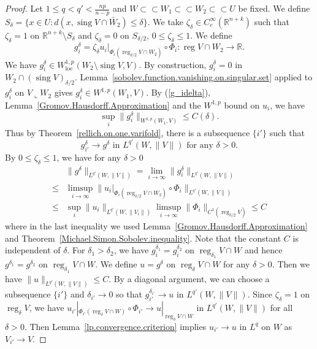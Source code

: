 \documentclass[11pt]{amsart}
\theoremstyle{definition}
\newcommand{\R}{\mathbb{R}}
\newcommand{\loc}{\mathrm{loc}}
\newcommand{\ssubset}{\subset\subset}
\DeclareMathOperator{\sing}{sing}
\DeclareMathOperator{\reg}{reg}
\begin{document}
\begin{proof}
	Let $1\le q<q'<\frac{np}{n-p}$ and $W\ssubset W_1\ssubset W_2\ssubset U$ be fixed. We define $S_\delta=\{x\in U:d(x,\sing V\cap \bar W_2)\le \delta\}$. We take $\zeta_\delta\in C_c^{\infty}(\R^{n+k})$ such that $\zeta_\delta=1$ on $\R^{n+k}\setminus S_{\delta}$ and $\zeta_\delta =0$ on $S_{\delta/2}$, $0\le\zeta_\delta\le 1$. We define 
	\begin{equation}\label{g_idelta}
		g_i^\delta=\zeta_{\delta} u_i|_{\Phi_i(\reg_{\delta/2} V\cap W_2)}\circ \Phi_i:\reg V\cap W_2\to \R.
	\end{equation}
    We have $g_i^\delta\in W^{1,p}_\loc(W_2\setminus \sing V,V)$. By construction, $g_i^\delta=0$ in $ W_2\cap (\sing V)_{\delta/2}$.  Lemma~\ref{sobolev.function.vanishing.on.singular.set} applied to $g_i^\delta$ on $V\llcorner W_2$ gives $g_i^\delta\in W^{1,p}(W_1,V)$. By (\ref{g_idelta}), Lemma~\ref{Gromov.Hausdorff.Approximation} and the $W^{1,p}$ bound on $u_i$, we have 
	\begin{equation}\label{w1p.bound.gdelta}
		\sup_i\|g_i^\delta\|_{W^{1,p}(W_1,V)}\le C(\delta).
	\end{equation} 
	Thus by Theorem~\ref{rellich.on.one.varifold}, there is a subsequence $\{i'\}$ such that 
	\begin{equation}\label{g.i.delta.to.g.delta}
		g_{i'}^\delta\to g^\delta \text{ in } L^{q'}(W,\|V\|)\text{ for any }\delta>0.
	\end{equation} By  $0\le \zeta_\delta \le 1$, we have for any $\delta>0$
	\[\begin{aligned}
		&\|g^\delta\|_{L^{q'}(W,\|V\|)}=\lim_{i\to\infty}\|g_i^\delta\|_{L^{q'}(W,\|V\|)}\\
        \le&\limsup_{i\to\infty}\|u_i|_{\Phi_i(\reg_{\delta/2} V\cap W_2)}\circ \Phi_i\|_{L^{q'}(W,\|V\|)} \\
		\le& \sup_i\|u_i\|_{L^{q'}(W,\|V_i\|)}\limsup_{i\to\infty}\|\Phi_i\|_{C^1(\reg_{\delta /2}V)}\le C
	\end{aligned}
	\]
	where in the last inequality we used Lemma~\ref{Gromov.Hausdorff.Approximation} and Theorem~\ref{Michael.Simon.Sobolev.inequality}. Note that the constant $C$ is independent of $\delta$. For $\delta_1>\delta_2$, we have $g^{\delta_1}_i=g^{\delta_2}_i$ on $\reg _{\delta _1}V\cap W$ and hence $g^{\delta_1}=g^{\delta_2}$ on $\reg _{\delta _1}V\cap W$. We define $u=g^\delta$ on $\reg_\delta V\cap W$ for any $\delta>0$. Then we have $\|u\|_{L^{q'}(W,\|V\|)}\le C$. By a diagonal argument, we can choose a subsequence $\{i'\}$ and $\delta_{i'}\to0$ so that $g_{i'}^{\delta_{i'}}\to u$ in $ L^{q'}(W,\|V\|)$. Since $\zeta_\delta=1$ on $\reg_\delta V$, we have $u_{i'}|_{\Phi_{i'}(\reg_\delta V\cap W)}\circ \Phi_{i'}\to u|_{\reg_\delta V\cap W}$ in $L^{q'}(W,\|V\|)$ for all $\delta>0$. Then Lemma~\ref{lp.convergence.criterion} implies $u_{i'}\to u$ in $L^q$ on $W$ as $V_{i'}\to V$.

\end{proof}
\end{document}
